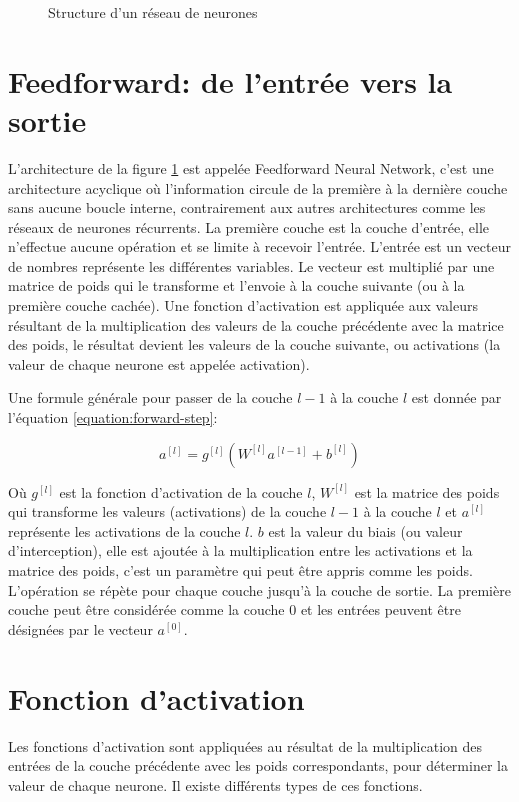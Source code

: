 \begin{figure}[h]
    \centering
	
    \caption{Structure d'un réseau de neurones}
    \label{fig:neural-network-structure}
\end{figure}

\section{Feedforward: de l'entrée vers la sortie}
\label{section:feedforward-neural-network}
L'architecture de la figure \ref{fig:neural-network-structure} est appelée Feedforward Neural Network, c'est une architecture acyclique où l'information circule de la première à la dernière couche sans aucune boucle interne, contrairement aux autres architectures comme les réseaux de neurones récurrents. La première couche est la couche d'entrée, elle n'effectue aucune opération et se limite à recevoir l'entrée. L'entrée est un vecteur de nombres représente les différentes variables. Le vecteur est multiplié par une matrice de poids qui le transforme et l'envoie à la couche suivante (ou à la première couche cachée). Une fonction d'activation est appliquée aux valeurs résultant de la multiplication des valeurs de la couche précédente avec la matrice des poids, le résultat devient les valeurs de la couche suivante, ou activations (la valeur de chaque neurone est appelée activation).

Une formule générale pour passer de la couche $l-1$ à la couche $l$ est donnée par l'équation \ref{equation:forward-step}:

\begin{equation}
    a^{[l]} = g^{[l]}(W^{[l]}a^{[l-1]}+b^{[l]})
    \label{equation:forward-step}
\end{equation}

Où $g^{[l]}$ est la fonction d'activation de la couche $l$, $W^{[l]}$ est la matrice des poids qui transforme les valeurs (activations) de la couche $l-1$ à la couche $l$ et $a^{[l]}$ représente les activations de la couche $l$. $b$ est la valeur du biais (ou valeur d'interception), elle est ajoutée à la multiplication entre les activations et la matrice des poids, c'est un paramètre qui peut être appris comme les poids. L'opération se répète pour chaque couche jusqu'à la couche de sortie.
La première couche peut être considérée comme la couche 0 et les entrées peuvent être désignées par le vecteur $a^{[0]}$.

\section{Fonction d'activation}
Les fonctions d'activation sont appliquées au résultat de la multiplication des entrées de la couche précédente avec les poids correspondants, pour déterminer la valeur de chaque neurone. Il existe différents types de ces fonctions.

